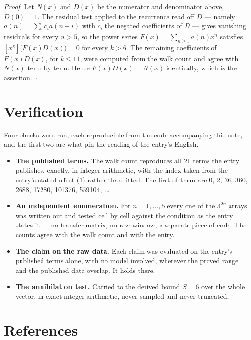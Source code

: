 \documentclass[11pt]{article}
\theoremstyle{definition}
\begin{document}
{\itshape Proof.} Let $N(x)$ and $D(x)$ be the numerator and denominator above, $D(0)=1$. The residual test applied to the recurrence read off $D$ --- namely $a(n) = \sum_i c_i a(n-i)$ with $c_i$ the negated coefficients of $D$ --- gives vanishing residuals for every $n > 5$, so the power series $F(x)=\sum_{n\ge 1}a(n)x^n$ satisfies $[x^k]\bigl(F(x)D(x)\bigr) = 0$ for every $k > 6$. The remaining coefficients of $F(x)D(x)$, for $k \le 11$, were computed from the walk count and agree with $N(x)$ term by term. Hence $F(x)D(x) = N(x)$ identically, which is the assertion. $\square$

\section{Verification}

Four checks were run, each reproducible from the code accompanying this note, and the first two are what pin the reading of the entry's English.

\begin{itemize}

\item {\bfseries The published terms.} The walk count reproduces all 21 terms the entry publishes, exactly, in integer arithmetic, with the index taken from the entry's stated offset (1) rather than fitted. The first of them are 0, 2, 36, 360, 2688, 17280, 101376, 559104,~\dots

\item {\bfseries An independent enumeration.} For $n = 1,\dots,5$ every one of the $3^{2n}$ arrays was written out and tested cell by cell against the condition as the entry states it --- no transfer matrix, no row window, a separate piece of code. The counts agree with the walk count and with the entry.

\item {\bfseries The claim on the raw data.} Each claim was evaluated on the entry's published terms alone, with no model involved, wherever the proved range and the published data overlap. It holds there.

\item {\bfseries The annihilation test.} Carried to the derived bound $S = 6$ over the whole vector, in exact integer arithmetic, never sampled and never truncated.

\end{itemize}

\section{References}
\end{document}

